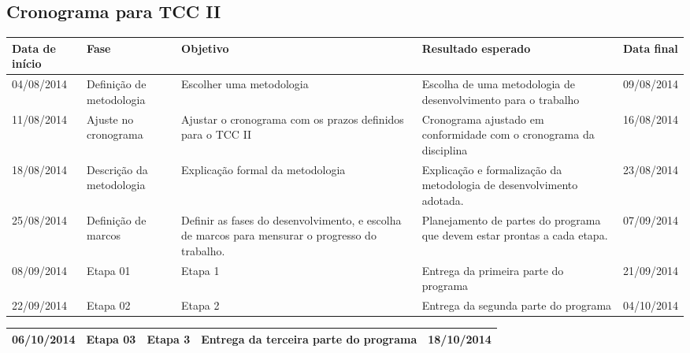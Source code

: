 \documentclass[
	12pt,				%
	openright,			%
	twoside,			%
	a4paper,			%
	Times,
	brazil,				%
	]{abntex2}
\begin{document}
\begin{apendicesenv}
\partapendices

\chapter{Cronograma para TCC II}
	\begin{center}
	\begin{tabularx}{\textwidth}{|X|X|X|X|X|}
		\hline
		
		Data de início & Fase & Objetivo & Resultado esperado & Data final \\ \hline
		
		04/08/2014 & Definição de metodologia & Escolher uma metodologia & Escolha de uma metodologia de desenvolvimento para o trabalho & 09/08/2014 \\ \hline

		11/08/2014 & Ajuste no cronograma & Ajustar o cronograma com os prazos definidos para o TCC II & Cronograma ajustado em conformidade com o cronograma da disciplina & 16/08/2014 \\ \hline
	
		18/08/2014 & Descrição da metodologia & Explicação formal da metodologia & Explicação e formalização da metodologia de desenvolvimento adotada. & 23/08/2014 \\ \hline

		25/08/2014 & Definição de marcos & Definir as fases do desenvolvimento, e escolha de marcos para mensurar o progresso do trabalho. & Planejamento de partes do programa que devem estar prontas a cada etapa. & 07/09/2014 \\ \hline

		08/09/2014 & Etapa 01 & Etapa 1 & Entrega da primeira parte do programa & 21/09/2014 \\ \hline
		
		22/09/2014 & Etapa 02 & Etapa 2 & Entrega da segunda parte do programa & 04/10/2014 \\ \hline

	\end{tabularx}
\end{center}
\begin{center}
	\begin{tabularx}{\textwidth}{|X|X|X|X|X|}
	\hline

		06/10/2014 & Etapa 03 & Etapa 3 & Entrega da terceira parte do programa & 18/10/2014 \\ \hline


\end{tabularx}
\end{center}
\end{apendicesenv}
\end{document}

